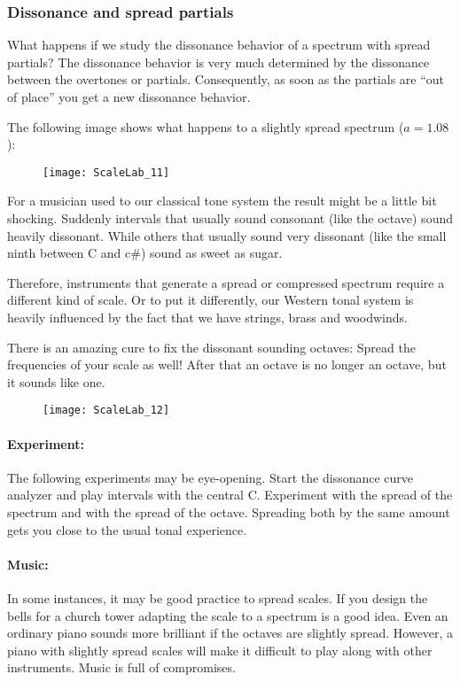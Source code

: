 \subsubsection{Dissonance and spread partials}
What happens if we study the dissonance behavior of a spectrum with spread partials? The dissonance behavior is very much determined by the dissonance between the overtones or partials. Consequently, as soon as the partials are ``out of place'' you get a new dissonance behavior.

The following image shows what happens to a slightly spread spectrum ($a=1.08$):

\begin{figure}[h]
\centering
\texttt{[image: ScaleLab\_11]}
\end{figure}


For a musician used to our classical tone system the result might be a little bit shocking. Suddenly intervals that usually sound consonant (like the octave) sound heavily dissonant. While others that usually sound very dissonant (like the small ninth between C and c\#) sound as sweet as sugar.

Therefore, instruments that generate a spread or compressed spectrum require a different kind of scale. Or to put it differently, our Western tonal system is heavily influenced by the fact that we have strings, brass and woodwinds.

There is an amazing cure to fix the dissonant sounding octaves: Spread the frequencies of your scale as well! After that an octave is no longer an octave, but it sounds like one.

\begin{figure}[h]
\centering
\texttt{[image: ScaleLab\_12]}
\end{figure}

\paragraph{Experiment:}
The following experiments may be eye-opening. Start the dissonance curve analyzer and play intervals with the central C. Experiment with the spread of the spectrum and with the spread of the octave. Spreading both by the same amount gets you close to the usual tonal experience.

\paragraph{Music:}
In some instances, it may be good practice to spread scales. If you design the bells for a church tower adapting the scale to a spectrum is a good idea. Even an ordinary piano sounds more brilliant if the octaves are slightly spread. However, a piano with slightly spread scales will make it difficult to play along with other instruments. Music is full of compromises.

